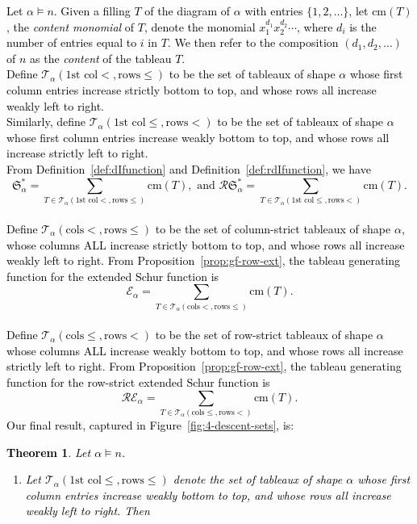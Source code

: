 \documentclass[12pt,letterpaper]{amsart}
\newcommand{\sheilaFeb}{\textcolor{black}}  \newcommand{\sheilaFebAgain}{\textcolor{magenta}}  \newcommand{\emn}{\textcolor{blue}}
\newtheorem{theorem}{Theorem}[section]
\theoremstyle{definition}
\newcommand{\dI}{\mathfrak{S}^*}
\newcommand{\rdI}{\mathcal{R}\mathfrak{S}^*}
\begin{document}
\sheilaFeb{
 Let $\alpha\vDash n$.   Given a filling $T$ of the diagram of $\alpha$ with entries $\{1,2,\ldots\}$, let $\mathrm{cm}(T)$, the \emph{content monomial} of $T$,  denote the monomial $x_1^{d_1} x_2^{d_2}\cdots$, 
where $d_i$ is the number of entries equal to $i$ in $T$. We then refer to the composition $(d_1,d_2,\ldots)$ of $n$ as the \emph{content} of the tableau $T$.
\\
Define $\mathcal{T}_\alpha({\text{1st col}<, \text{rows}\le})$ to be the set of tableaux of shape $\alpha$ whose first column entries increase strictly bottom to top, and whose rows all increase weakly left to right.
\\
Similarly, define $\mathcal{T}_\alpha({\text{1st col}\le, \text{rows}<})$ to be the set of tableaux of shape $\alpha$ whose first column entries increase weakly bottom to top, and whose rows all increase strictly left to right.
\\
From Definition~\ref{def:dIfunction} and  Definition~\ref{def:rdIfunction}, we have 
\[\dI_\alpha=\sum_{T\in  \mathcal{T}_\alpha({\text{1st col}<, \text{rows}\le})}  \mathrm{cm}(T), \text{ and } \rdI_\alpha=\sum_{T\in  \mathcal{T}_\alpha({\text{1st col}\le, \text{rows}<})}  \mathrm{cm}(T).\]
\\
Define $\mathcal{T}_\alpha({\text{cols}<, \text{rows}\le})$ to be the set of column-strict  tableaux of shape $\alpha$, whose  columns ALL increase strictly bottom to top, and whose rows all increase weakly left to right.  From Proposition~\ref{prop:gf-row-ext}, the tableau generating function for the extended Schur function is
\[\mathcal{E}_\alpha=\sum_{T\in  \mathcal{T}_\alpha({\text{cols}<, \text{rows}\le})}  \mathrm{cm}(T).\]
\\
Define $\mathcal{T}_\alpha({\text{cols}\le, \text{rows}<})$ to be the set of row-strict  tableaux of shape $\alpha$ whose  columns ALL increase weakly bottom to top, and whose rows all increase strictly left to right.
From Proposition~\ref{prop:gf-row-ext}, the tableau generating function for the row-strict extended Schur function is
\[\mathcal{R}\mathcal{E}_\alpha=\sum_{T\in  \mathcal{T}_\alpha({\text{cols}\le, \text{rows}<})}  \mathrm{cm}(T).\]
Our final result, captured in Figure~\ref{fig:4-descent-sets}, is:
\begin{theorem}\label{thm:8flavours-tableaux}  Let $\alpha\vDash n$.   
\begin{enumerate}
\item Let $\mathcal{T}_\alpha({\text{1st col}\le, \text{rows}\le})$ denote the set of tableaux of shape $\alpha$ whose first column entries increase weakly bottom to top, and whose rows all increase weakly left to right. Then 

\end{enumerate}
\end{theorem}}
\end{document}
